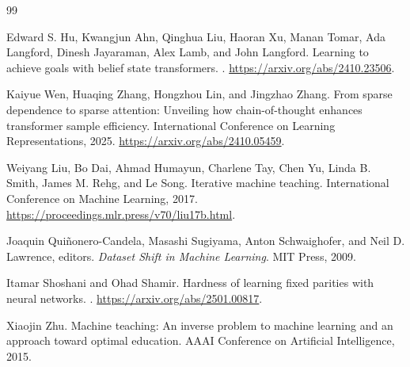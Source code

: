 \documentclass[11pt,twoside]{article}
\theoremstyle{definition}
\theoremstyle{remark}
\begin{document}
\clearpage
\begin{thebibliography}{99}

Edward S. Hu, Kwangjun Ahn, Qinghua Liu, Haoran Xu, Manan Tomar,
Ada Langford, Dinesh Jayaraman, Alex Lamb, and John Langford.
\newblock Learning to achieve goals with belief state transformers.
. \url{https://arxiv.org/abs/2410.23506}.

Kaiyue Wen, Huaqing Zhang, Hongzhou Lin, and Jingzhao Zhang.
\newblock From sparse dependence to sparse attention: Unveiling how
chain-of-thought enhances transformer sample efficiency.
\newblock International Conference on Learning Representations, 2025.
\newblock \url{https://arxiv.org/abs/2410.05459}.

Weiyang Liu, Bo Dai, Ahmad Humayun, Charlene Tay, Chen Yu, Linda B. Smith,
James M. Rehg, and Le Song.
\newblock Iterative machine teaching.
\newblock International Conference on Machine Learning, 2017.
\newblock \url{https://proceedings.mlr.press/v70/liu17b.html}.

Joaquin Qui\~nonero-Candela, Masashi Sugiyama, Anton Schwaighofer, and
Neil D. Lawrence, editors.
\newblock \emph{Dataset Shift in Machine Learning}.
\newblock MIT Press, 2009.

Itamar Shoshani and Ohad Shamir.
\newblock Hardness of learning fixed parities with neural networks.
. \url{https://arxiv.org/abs/2501.00817}.

Xiaojin Zhu.
\newblock Machine teaching: An inverse problem to machine learning and an
approach toward optimal education.
\newblock AAAI Conference on Artificial Intelligence, 2015.

\end{thebibliography}
\end{document}
